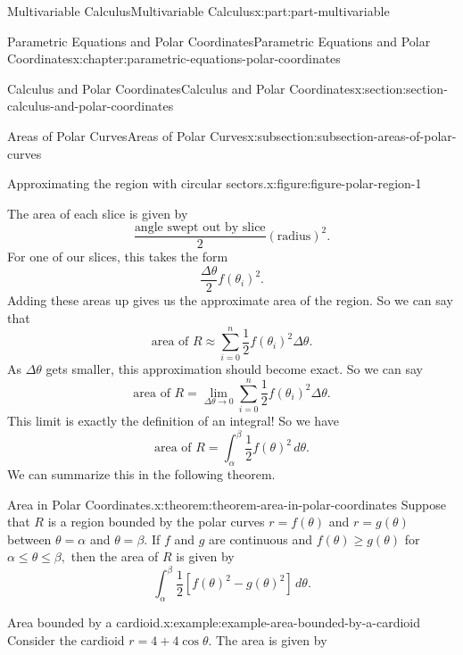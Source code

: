\documentclass[twoside,10pt,]{tufte-book}
\numberwithin{equation}{part}
\begin{document}
\begin{partptx}{Multivariable Calculus}{}{Multivariable Calculus}{}{}{x:part:part-multivariable}
\begin{chapterptx}{Parametric Equations and Polar Coordinates}{}{Parametric Equations and Polar Coordinates}{}{}{x:chapter:parametric-equations-polar-coordinates}
\begin{sectionptx}{Calculus and Polar Coordinates}{}{Calculus and Polar Coordinates}{}{}{x:section:section-calculus-and-polar-coordinates}
\begin{subsectionptx}{Areas of Polar Curves}{}{Areas of Polar Curves}{}{}{x:subsection:subsection-areas-of-polar-curves}
\begin{figureptx}{Approximating the region with circular sectors.}{x:figure:figure-polar-region-1}{}
\begin{image}{0}{1}{0}
{
}%
\end{image}%
\tcblower
\end{figureptx}%
The area of each slice is given by%
%
\begin{equation*}
\frac{\text{angle swept out by slice}}{2}(\text{radius})^{2}.
\end{equation*}
For one of our slices, this takes the form%
%
\begin{equation*}
\frac{\Delta\theta}{2}f(\theta_{i})^{2}.
\end{equation*}
Adding these areas up gives us the approximate area of the region. So we can say that%
%
\begin{equation*}
\text{area of }R \approx \sum_{i=0}^{n}\frac{1}{2}f(\theta_{i})^{2}\Delta\theta.
\end{equation*}
As \(\Delta\theta\) gets smaller, this approximation should become exact. So we can say%
%
\begin{equation*}
\text{area of }R = \lim_{\Delta\theta\to0}\sum_{i=0}^{n}\frac{1}{2}f(\theta_{i})^{2}\Delta\theta.
\end{equation*}
This limit is exactly the definition of an integral! So we have%
%
\begin{equation*}
\text{area of }R = \int_{\alpha}^{\beta}\frac{1}{2}f(\theta)^{2}\,d\theta.
\end{equation*}
We can summarize this in the following theorem.%
\begin{theorem}{Area in Polar Coordinates.}{}{x:theorem:theorem-area-in-polar-coordinates}%
%
Suppose that \(R\) is a region bounded by the polar curves \(r=f(\theta)\) and \(r=g(\theta)\) between \(\theta = \alpha\) and \(\theta=\beta\). If \(f\) and \(g\) are continuous and \(f(\theta)\geq g(\theta)\) for \(\alpha\leq\theta\leq\beta,\) then the area of \(R\) is given by%
\begin{equation*}
\int_{\alpha}^{\beta}\frac{1}{2}[f(\theta)^{2}-g(\theta)^{2}]\,d\theta.
\end{equation*}
%
\end{theorem}
\begin{example}{Area bounded by a cardioid.}{x:example:example-area-bounded-by-a-cardioid}%
Consider the cardioid\footnotemark{} \(r = 4+4\cos\theta\). The area is given by%
%
\begin{equation*}

\end{equation*}
\end{example}
\end{subsectionptx}
\end{sectionptx}
\end{chapterptx}
\end{partptx}
\end{document}
